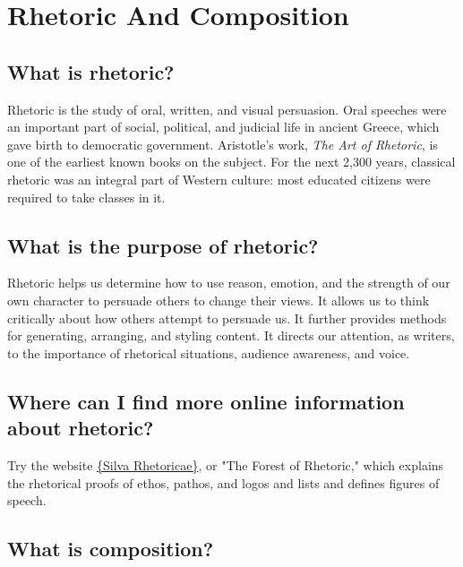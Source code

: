 
\chapter{Rhetoric And Composition}


\section{What is rhetoric?}

Rhetoric is the study of oral, written, and visual persuasion. Oral speeches were an 
important part of social, political, and judicial life in ancient Greece, which gave birth 
to democratic government. Aristotle's work, \emph{The Art of Rhetoric}, is one of the 
earliest known books on the subject. For the next 2,300 years, classical rhetoric was an 
integral part of Western culture: most educated citizens were required to take classes 
in it.

\section{What is the purpose of rhetoric?}

Rhetoric helps us determine how to use reason, emotion, and the strength of our own 
character to persuade others to change their views. It allows us to think critically about 
how others attempt to persuade us. It further provides methods for generating, 
arranging, and styling content. It directs our attention, as writers, to the importance 
of rhetorical situations, audience awareness, and voice.

\section{Where can I find more online information about rhetoric?}

Try the website \href{http://rhetoric.byu.edu} {\{Silva Rhetoricae\}}, or "The Forest of 
Rhetoric," which explains the rhetorical proofs of ethos, pathos, and logos and lists and 
defines figures of speech.


\section{What is composition?}

